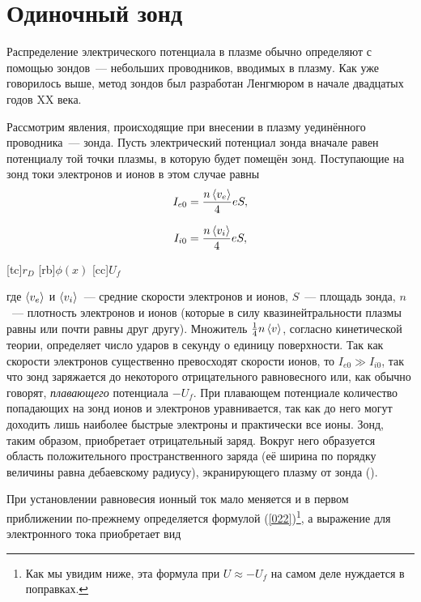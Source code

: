 \section{Одиночный зонд}

Распределение электрического потенциала в плазме обычно определяют с помощью зондов~--- небольших проводников, вводимых в
плазму. Как уже говорилось выше, метод зондов был разработан Ленгмюром в начале двадцатых годов XX века.

Рассмотрим явления, происходящие при внесении в плазму уединённого проводника~--- зонда. Пусть электрический потенциал
зонда вначале равен потенциалу той точки плазмы, в которую будет помещён зонд. Поступающие на зонд токи электронов и
ионов в этом случае равны
\begin{equation}
  \eqmark[021]
I_{e0}=\frac{n\average{v_e}}{4}eS,
\end{equation}

\begin{equation}
  \eqmark[022]
I_{i0}=\frac{n\average{v_i}}{4}eS,
\end{equation}

[tc]{$r_D$}
[rb]{$\phi(x)$}
[cc]{$U_f$}

где $\left< v_e \right>$ и $\left< v_i \right>$~--- средние скорости электронов и ионов, $S$~--- площадь зонда, $n$~--- плотность
электронов и ионов (которые в силу квазинейтральности плазмы равны или почти равны друг другу). Множитель $\frac14
n\left< v \right>$, согласно кинетической теории, определяет число ударов в секунду о единицу поверхности. Так как скорости
электронов существенно превосходят скорости ионов, то $I_{e0}\gg I_{i0}$, так что зонд заряжается до некоторого
отрицательного равновесного или, как обычно говорят, \textit{плавающего} потенциала $-U_f$. При плавающем потенциале
количество попадающих на зонд ионов и электронов уравнивается, так как до него могут доходить лишь наиболее быстрые
электроны и практически все ионы. Зонд, таким образом, приобретает отрицательный заряд. Вокруг него образуется область
положительного пространственного заряда (её ширина по порядку величины равна дебаевскому радиусу), экранирующего плазму
от зонда ().

При установлении равновесия ионный ток мало меняется и в первом приближении по-прежнему определяется формулой
(\eqref{022})\footnote{Как мы увидим ниже, эта формула при $U\approx -U_f$ на самом деле нуждается в поправках.}, а
выражение для электронного тока приобретает вид

